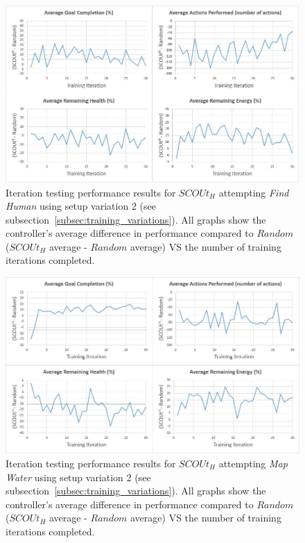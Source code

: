 \begin{appx}
\begin{figure}[H]
  \includegraphics[width=0.9\columnwidth]{Figures/Results/TrainingVariation2/Hybrid-FindHuman.JPG}
  \caption{Iteration testing performance results for $SCOUt_{H}$ attempting \textit{Find Human} using setup variation 2 (see subsection~\ref{subsec:training_variations}). All graphs show the controller's average difference in performance compared to $Random$ ($SCOUt_{H}$ average - $Random$ average) VS the number of training iterations completed.}
  \label{appendix:hybrid_training_fh_variation2}
\end{figure}
\end{appx}


\begin{appx}
\begin{figure}[H]
  \includegraphics[width=0.9\columnwidth]{Figures/Results/TrainingVariation2/Hybrid-MapWater.JPG}
  \caption{Iteration testing performance results for $SCOUt_{H}$ attempting \textit{Map Water} using setup variation 2 (see subsection~\ref{subsec:training_variations}). All graphs show the controller's average difference in performance compared to $Random$ ($SCOUt_{H}$ average - $Random$ average) VS the number of training iterations completed.}
  \label{appendix:hybrid_training_mw_variation2}
\end{figure}
\end{appx}





